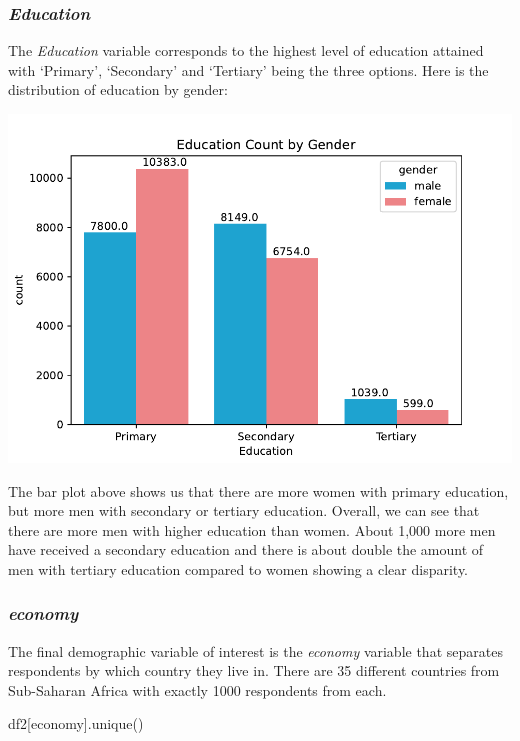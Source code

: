 \documentclass[water,article,submit,moreauthors,pdftex]{mdpi}
\newenvironment{Shaded}{\begin{snugshade}}{\end{snugshade}}
\newcommand{\NormalTok}[1]{#1}
\newcommand{\StringTok}[1]{\textcolor[rgb]{0.31,0.60,0.02}{#1}}
\begin{document}
\hypertarget{education}{%
\subsubsection{\texorpdfstring{\emph{Education}}{Education}}\label{education}}

The \emph{Education} variable corresponds to the highest level of
education attained with `Primary', `Secondary' and `Tertiary' being the
three options. Here is the distribution of education by gender:

\includegraphics{term_paper_files/figure-latex/unnamed-chunk-7-3.pdf}

The bar plot above shows us that there are more women with primary
education, but more men with secondary or tertiary education. Overall,
we can see that there are more men with higher education than women.
About 1,000 more men have received a secondary education and there is
about double the amount of men with tertiary education compared to women
showing a clear disparity.

\hypertarget{economy}{%
\subsubsection{\texorpdfstring{\emph{economy}}{economy}}\label{economy}}

The final demographic variable of interest is the \emph{economy}
variable that separates respondents by which country they live in. There
are 35 different countries from Sub-Saharan Africa with exactly 1000
respondents from each.

\begin{Shaded}
\begin{Highlighting}[]
\NormalTok{df2[}\StringTok{\textquotesingle{}economy\textquotesingle{}}\NormalTok{].unique()}
\end{Highlighting}
\end{Shaded}
\end{document}
